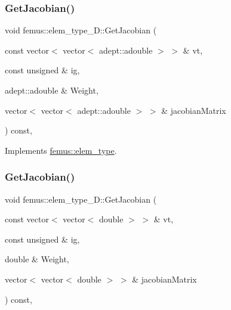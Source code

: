 \subsubsection{\texorpdfstring{Get\+Jacobian()}{GetJacobian()}\hspace{0.1cm}{\footnotesize\ttfamily [1/2]}}
{\footnotesize\ttfamily void femus\+::elem\+\_\+type\+\_\+D\+::\+Get\+Jacobian (\begin{DoxyParamCaption}\item[{const vector$<$ vector$<$ adept\+::adouble $>$ $>$ \&}]{vt,  }\item[{const unsigned \&}]{ig,  }\item[{adept\+::adouble \&}]{Weight,  }\item[{vector$<$ vector$<$ adept\+::adouble $>$ $>$ \&}]{jacobian\+Matrix }\end{DoxyParamCaption}) const\hspace{0.3cm}{\ttfamily [inline]}, {\ttfamily [virtual]}}



Implements \mbox{\hyperlink{classfemus_1_1elem__type_aa8e617c54dd774ffca5d305605552af7}{femus\+::elem\+\_\+type}}.

\mbox{\label{classfemus_1_1elem__type__3_d_aacb6b130a8421fe901505f6d61ad8ddd}} 
\subsubsection{\texorpdfstring{Get\+Jacobian()}{GetJacobian()}\hspace{0.1cm}{\footnotesize\ttfamily [2/2]}}
{\footnotesize\ttfamily void femus\+::elem\+\_\+type\+\_\+D\+::\+Get\+Jacobian (\begin{DoxyParamCaption}\item[{const vector$<$ vector$<$ double $>$ $>$ \&}]{vt,  }\item[{const unsigned \&}]{ig,  }\item[{double \&}]{Weight,  }\item[{vector$<$ vector$<$ double $>$ $>$ \&}]{jacobian\+Matrix }\end{DoxyParamCaption}) const\hspace{0.3cm}{\ttfamily [inline]}, {\ttfamily [virtual]}}




